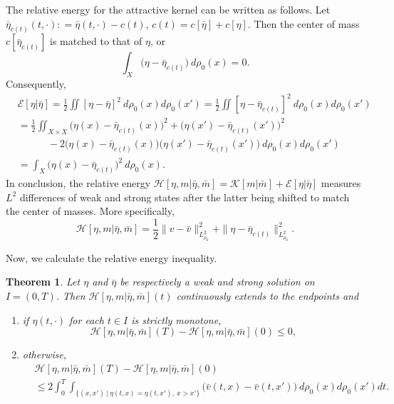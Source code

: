 \documentclass[10pt, letterpaper]{article}
\def\E{{\mathcal{E}}}
\def\H{{\mathcal{H}}}
\def\K{{\mathcal{K}}}
\def\drr{{d\rho_0(x)d\rho_0(x')}}
\def\dr{{d\rho_0(x)}}
\newtheorem{theorem}{Theorem}
\theoremstyle{definition}
\theoremstyle{remark}
\begin{document}
The relative energy for the attractive kernel can be written as follows. Let $\bar\eta_{c(t)}(t,\cdot): = \bar\eta(t,\cdot) - c(t)$, $c(t) = c[\bar\eta] + c[\eta]$. Then the center of mass $c[\bar\eta_{c(t)}]$ is matched to that of $\eta$, or
$$ \int_X \big(\eta - \bar\eta_{c(t)}\big) \: \dr =0.$$
Consequently, 
\begin{align*}
 &\E[\eta|\bar\eta] = \frac{1}{2}\iint [\eta-\bar\eta]^2\:\drr = \frac{1}{2}\iint [\eta-\bar\eta_{c(t)}]^2\:\drr\\
 &= \frac{1}{2} \iint_{X\times X} \big(\eta(x)-\bar\eta_{c(t)}(x)\big)^2 + \big(\eta(x')-\bar\eta_{c(t)}(x')\big)^2 \\
 & \quad \quad \quad - 2\big(\eta(x)-\bar\eta_{c(t)}(x)\big)\big(\eta(x')-\bar\eta_{c(t)}(x')\big)\:\drr\\
 &= \int_X \big(\eta(x)-\bar\eta_{c(t)}\big)^2 \:\dr.
\end{align*}
In conclusion, the relative energy $\H[\eta,m|\bar\eta,\bar{m}] = \K[m|\bar{m}] + \E[\eta|\bar\eta]$ measures $L^2$ differences of weak and strong states after the latter being shifted to match the center of masses. More specifically,
$$ \H[\eta,m|\bar\eta,\bar{m}] = \frac{1}{2} \|v - \bar{v}\|_{L^2_{\rho_0}}^2 + \|\eta - \bar\eta_{c(t)}\|_{L^2_{\rho_0}}^2.$$

Now, we calculate the relative energy inequality.
\begin{theorem} \label{ineqthm2}
 Let $\eta$ and $\bar\eta$ be respectively a weak and strong solution on $I=(0,T)$. Then $\H[\eta,m|\bar\eta, \bar{m}](t)$ continuously extends to the endpoints and 
 \begin{enumerate}
  \item if $\eta(t,\cdot)$ for each $t\in I$ is strictly monotone,
    \begin{equation} \label{relineq2}
            \H[\eta, m|\bar{\eta}, \bar{m}](T) - \H[\eta, m| \bar{\eta}, \bar{m}](0) \le 0,
    \end{equation}
  \item otherwise, 
    \begin{equation} \label{relineq3}
    \begin{aligned}
            &\H[\eta, m|\bar{\eta}, \bar{m}](T) - \H[\eta, m| \bar{\eta}, \bar{m}](0) \\
            & \leq  2\int_0^T\int_{\{(x,x')~|~\eta(t,x)=\eta(t,x'), ~x>x'\}} \big(\bar{v}(t, x) - \bar{v}(t, x')\big)\: \drr dt.
    \end{aligned}
    \end{equation}
  \end{enumerate}
\end{theorem}
\end{document}
